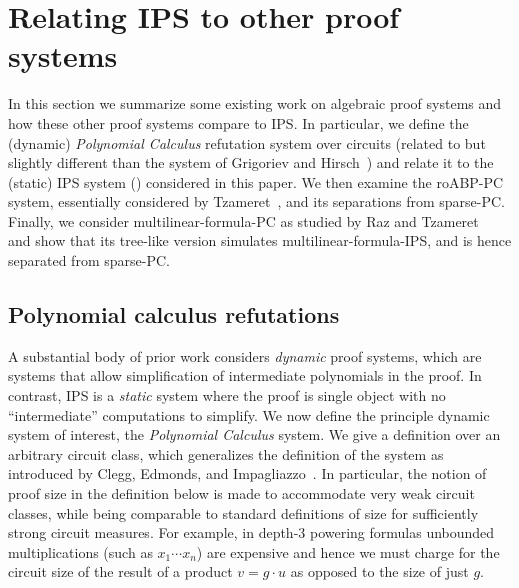 \documentclass[11pt]{article}
\numberwithin{equation}{section}
\theoremstyle{definition}
\theoremstyle{plain}
\begin{document}
%
%
%

\appendix



%
%
%
%

\section{Relating IPS to other proof systems}\label{sec:alg-proofs}

In this section we summarize some existing work on algebraic proof systems and how these other proof systems compare to IPS\@. In particular, we define the (dynamic) \emph{Polynomial Calculus} refutation system over circuits (related to but slightly different than the system of Grigoriev and Hirsch~\cite{GrigorievHirsch03}) and relate it to the (static) IPS system (\cite{Pitassi97,DBLP:journals/jacm/GrochowP18}) considered in this paper.  We then examine the roABP-PC system, essentially considered by Tzameret~\cite{Tzameret11}, and its separations from sparse-PC\@.  Finally, we consider multilinear-formula-PC as studied by Raz and Tzameret~\cite{RazTzameret08a,RazTzameret08b} and show that its tree-like version simulates multilinear-formula-IPS, and is hence separated from sparse-PC.

\subsection{Polynomial calculus refutations}

A substantial body of prior work considers \emph{dynamic} proof systems, which are systems that allow simplification of intermediate polynomials in the proof.  In contrast, IPS is a \emph{static} system where the proof is single object with no ``intermediate'' computations to simplify.  We now define the principle dynamic system of interest, the \emph{Polynomial Calculus} system.  We give a definition over an arbitrary circuit class, which generalizes the definition of the system as introduced by Clegg, Edmonds, and Impagliazzo~\cite{CleggEI96}.  In particular, the notion of proof size in the
%
definition below   %
is made to accommodate very weak circuit classes, while being comparable to standard definitions of size for sufficiently strong circuit measures.  For example, in depth-3 powering formulas unbounded multiplications (such as $x_1\cdots x_n$) are expensive and hence we must charge for the circuit size of the result of a product $v=g\cdot u$ as opposed to the size of just $g$.
\end{document}
